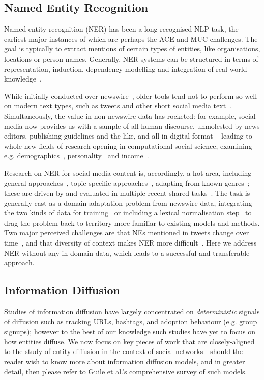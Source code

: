 \documentclass[review]{elsarticle}
\begin{document}
\subsection{Named Entity Recognition}
Named entity recognition (NER) has been a long-recognised NLP task, the earliest major instances of which are perhaps the ACE and MUC challenges.
The goal is typically to extract mentions of certain types of entities, like organisations, locations or person names.
Generally, NER systems can be structured in terms of representation, induction, dependency modelling and integration of real-world knowledge~\cite{nadeau2007survey,ratinov2009design}.

While initially conducted over newswire~\cite{tjong2003introduction}, older tools tend not to perform so well on modern text types, such as tweets and other short social media text~\cite{derczynski2013microblog}.
Simultaneously, the value in non-newswire data has rocketed: for example, social media now provides us with a sample of all human discourse, unmolested by news editors, publishing guidelines and the like, and all in digital format -- leading to whole new fields of research opening in computational social science, examining e.g. demographics~\cite{hovy2015user}, personality~\cite{plank2015personality} and income~\cite{preoctiuc2015studying}.

Research on NER for social media content is, accordingly, a hot area, including general approaches~\cite{ritter2011named}, topic-specific approaches~\cite{liu2011recognizing}, adapting from known genres~\cite{plank2014adapting}; these are driven by and evaluated in multiple recent shared tasks~\cite{rowe2015microposts2015,baldwin2015shared}.
The task is generally cast as a domain adaptation problem from newswire data, integrating the two kinds of data for training~\cite{cherryunreasonable} or including a lexical normalisation step~\cite{han2011lexical} to drag the problem back to territory more familiar to existing models and methods.
Two major perceived challenges are that NEs mentioned in tweets change over time~\cite{fromreide2014crowdsourcing}, and that diversity of context makes NER more difficult~\cite{derczynski2015analysis}. 
Here we address NER without any in-domain data, which leads to a successful and transferable approach.


\subsection{Information Diffusion}
Studies of information diffusion have largely concentrated on \emph{deterministic} signals of diffusion such as tracking URLs, hashtags, and adoption behaviour (e.g. group signups); however to the best of our knowledge such studies have yet to focus on how entities diffuse.
We now focus on key pieces of work that are closely-aligned to the study of entity-diffusion in the context of social networks - should the reader wish to know more about information diffusion models, and in greater detail, then please refer to Guile et al.'s \cite{guille2013information} comprehensive survey of such models.
\end{document}
